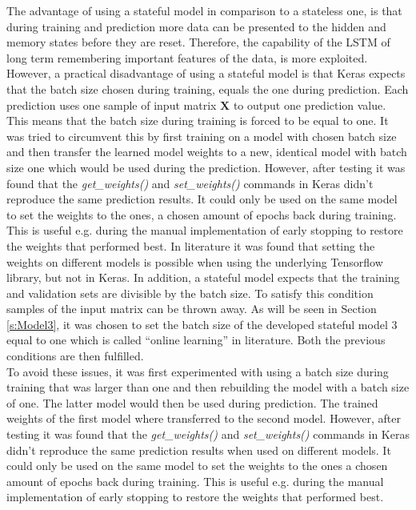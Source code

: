 The advantage of using a stateful model in comparison to a stateless one, is that during training and prediction more data can be presented to the hidden and memory states before they are reset. Therefore, the capability of the LSTM of long term remembering important features of the data, is more exploited. However, a practical disadvantage of using a stateful model is that Keras expects that the batch size chosen during training, equals the one during prediction. Each prediction uses one sample of input matrix $ \bm{X} $ to output one prediction value. This means that the batch size during training is forced to be equal to one. It was tried to circumvent this by first training on a model with chosen batch size and then transfer the learned model weights to a new, identical model with batch size one which would be used during the prediction. However, after testing it was found that the \textit{get\_weights()} and \textit{set\_weights()} commands in Keras didn't reproduce the same prediction results. It could only be used on the same model to set the weights to the ones, a chosen amount of epochs back during training. This is useful e.g. during the manual implementation of early stopping to restore the weights that performed best. In literature it was found that setting the weights on different models is possible when using the underlying Tensorflow library, but not in Keras. In addition, a stateful model expects that the training and validation sets are divisible by the batch size. To satisfy this condition samples of the input matrix can be thrown away. As will be seen in Section \ref{s:Model3}, it was chosen to set the batch size of the developed stateful model 3 equal to one which is called ``online learning'' in literature. Both the previous conditions are then fulfilled.\\


To avoid these issues, it was first experimented with using a batch size during training that was larger than one and then rebuilding the model with a batch size of one. The latter model would then be used during prediction. The trained weights of the first model where transferred to the second model. However, after testing it was found that the \textit{get\_weights()} and \textit{set\_weights()} commands in Keras didn't reproduce the same prediction results when used on different models. It could only be used on the same model to set the weights to the ones a chosen amount of epochs back during training. This is useful e.g. during the manual implementation of early stopping to restore the weights that performed best. 

